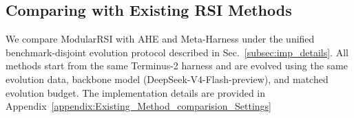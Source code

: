 \documentclass{article} %
\begin{document}
\subsection{Comparing with Existing RSI Methods}
\label{subsec:Comparing_with_Existing_RSI_Methods}












We compare ModularRSI with AHE and Meta-Harness under the unified benchmark-disjoint evolution protocol described in Sec.~\ref{subsec:imp_details}. All methods start from the same Terminus-2 harness and are evolved using the same evolution data, backbone model (DeepSeek-V4-Flash-preview), and matched evolution budget.
The implementation details are provided in Appendix~\ref{appendix:Existing_Method_comparision_Settings}
\end{document}
